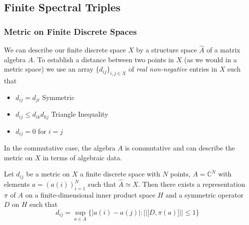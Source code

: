 \subsection{Finite Spectral Triples\label{sec:2}}
\subsubsection{Metric on Finite Discrete Spaces}
We can describe our finite discrete space $X$ by a structure space $\hat{A}$
of a matrix algebra $A$. To establish a distance between two points in $X$ (as
we would in a metric space) we use an array $\{d_{ij}\}_{i, j \in X}$ of
\textit{real non-negative} entries in $X$ such that
\begin{itemize}
    \item $d_{ij} = d_{ji}$             Symmetric
    \item $d_{ij} \leq d_{ik} d_{kj}$       Triangle Inequality
    \item $d_{ij} = 0$ for $i=j$
\end{itemize}

In the commutative case, the algebra $A$ is commutative and can describe the
metric on $X$ in terms of algebraic data.
\begin{mytheorem}
    Let $d_{ij}$ be a metric on $X$ a finite discrete space with $N$ points, $A = \mathbb{C}^N$
    with elements $a = (a(i))_{i=1}^N$ such that $\hat{A} \simeq X$. Then there exists a
    representation $\pi$ of $A$ on a finite-dimensional inner product space $H$ and a symmetric
    operator $D$ on $H$ such that
    \begin{equation}
        d_{ij} = \sup_{a\in A}\bigg\{\big|a(i)-a(j)\big| : |\big|\big[D,
            \pi(a)]\big|\big| \leq 1\bigg\}
    \end{equation}
\end{mytheorem}

